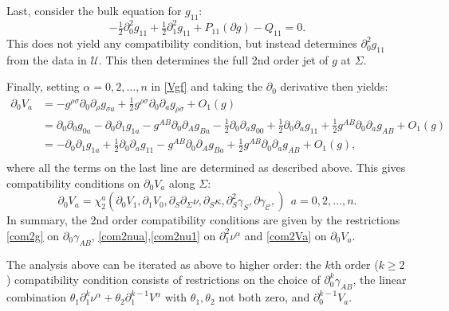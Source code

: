 \documentclass[10pt]{amsart}
\renewcommand{\a}{\alpha}
\newcommand{\g}{\gamma}
\newcommand{\s}{\sigma}
\newcommand{\Si}{\Sigma}
\renewcommand{\k}{\kappa}
\newcommand{\cC}{{\mathcal C}}
\newcommand{\cU}{{\mathcal U}}
\newcommand{\be}{\begin{equation}}
\newcommand{\ee}{\end{equation}}
\newcommand{\bes}{\begin{equation*}}
\newcommand{\ees}{\end{equation*}}
\newcommand{\p}{\partial}
\newcommand{\<}{\langle}
\renewcommand{\>}{\rangle}
\theoremstyle{plain}
\theoremstyle{remark}
\theoremstyle{definition}
\numberwithin{equation}{section}
\begin{document}
Last, consider the bulk equation for $g_{11}$:
\bes
-\tfrac{1}{2}\p_0^2 g_{11}+\tfrac{1}{2}\p_1^2 g_{11}+P_{11}(\p g)-Q_{11}=0. 
\ees
This does not yield any compatibility condition, but instead determines $\p_0^2 g_{11}$ from the data in $\cU$. This then determines the full 
2nd order jet of $g$ at $\Si$. 

 Finally, setting $\a=0,2, \dots, n$ in \eqref{Vgf} and taking the $\p_0$ derivative then yields:
\bes\begin{split}
\p_0V_a&=-g^{\rho\s}\p_0\p_\rho g_{\s a}+\tfrac{1}{2}g^{\rho\s}\p_0\p_a g_{\rho\s}+O_1(g)\\
&=\p_0\p_0 g_{0 a}-\p_0\p_1 g_{1 a}-g^{AB}\p_0\p_A g_{B a}-\tfrac{1}{2}\p_0\p_a g_{00}+\tfrac{1}{2}\p_0\p_a g_{11}+\tfrac{1}{2}g^{AB}\p_0\p_a g_{AB}+O_1(g)\\
&=-\p_0\p_1 g_{1 a}+\tfrac{1}{2}\p_0\p_a g_{11}-g^{AB}\p_0\p_A g_{B a}+\tfrac{1}{2}g^{AB}\p_0\p_a g_{AB}+O_1(g), \\
\end{split}\ees
where all the terms on the last line are determined as described above. This gives compatibility conditions on $\p_0V_a$ along $\Si$:
\be\label{com2Va}
\p_0V_a=\chi_2^a(\p_0 V_1,\p_1 V_0,\p_S\p_\Si \nu, \p_S \k, \p_S^2 \g_S, \p \g_{\cC}, )\ \ a=0,2, \dots, n. 
\ee
In summary, the 2nd order compatibility conditions are given by the restrictions \eqref{com2g} on $\p_0 \g_{AB}$, \eqref{com2nua},\eqref{com2nu1} on $\p^2_1 \nu^\a$ 
and \eqref{com2Va} on $\p_0 V_a$.

\medskip 

The analysis above can be iterated as above to higher order: the $k$th order ($k\geq 2$) compatibility condition consists of restrictions on the choice of $\p^k_0 \g_{AB}$, 
the linear combination $\theta_1\p_1^k \nu^\a+\theta_2\p_1^{k-1} V^\a$ with $\theta_1,\theta_2$ not both zero, and $\p^{k-1}_0 V_a$.
\end{document}
